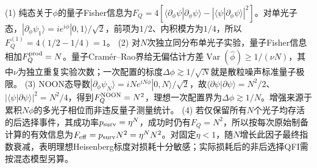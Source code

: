 (1) 纯态关于\(\phi\)的量子Fisher信息为\(F_Q=4[\langle\partial_\phi\psi|\partial_\phi\psi\rangle-|\langle\psi|\partial_\phi\psi\rangle|^2]\)。对单光子态，\(|\partial_\phi\psi_1\rangle=ie^{i\phi}|0,1\rangle/\sqrt2\)，前项为\(1/2\)、内积模方为\(1/4\)，所以\(F_Q^{(1)}=4(1/2-1/4)=1\)。
(2) 对\(N\)次独立同分布单光子实验，量子Fisher信息相加\(F_Q^{\rm prod}=N\)。量子Cramér–Rao界给无偏估计方差\(\operatorname{Var}(\hat\phi)\ge1/(\nu N)\)，其中\(\nu\)为独立重复实验次数；一次配置的标度\(\Delta\phi\gtrsim1/\sqrt N\)就是散粒噪声标准量子极限。
(3) NOON态导数\(|\partial_\phi\psi_N\rangle=iNe^{iN\phi}|0,N\rangle/\sqrt2\)，故\(\langle\partial\psi|\partial\psi\rangle=N^2/2\)、\(|\langle\psi|\partial\psi\rangle|^2=N^2/4\)，得到\(F_Q^{\rm NOON}=N^2\)，理想一次配置界为\(\Delta\phi\gtrsim1/N\)。增强来源于累积\(N\phi\)的多光子相位而非违反量子测量统计。
(4) 若仅保留所有\(N\)个光子均存活的后选择事件，其成功率\(p_{\rm surv}=\eta^N\)，成功时仍有\(F_Q=N^2\)，所以按每次原始制备计算的有效信息为\(F_{\rm eff}=p_{\rm surv}N^2=\eta^N N^2\)。对固定\(\eta<1\)，随\(N\)增长此因子最终指数衰减，表明理想Heisenberg标度对损耗十分敏感；实际损耗后的非后选择QFI需按混态模型另算。
